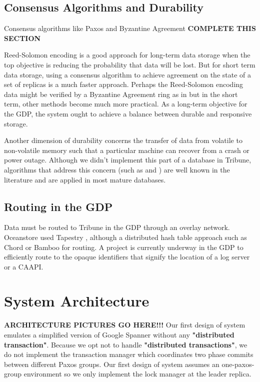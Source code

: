 \documentclass[10pt,twocolumn]{article}
\begin{document}
\subsection{Consensus Algorithms and Durability}

Consensus algorithms like Paxos \cite{Lamport_paxos} and Byzantine Agreement \cite{lamport_byzantine_1982}  \textbf{COMPLETE THIS SECTION}

Reed-Solomon encoding \cite{Reed-Solomon}  is a good approach for long-term data storage when the top objective is reducing the probability that data will be lost. But for short term data storage, using a consensus algorithm to achieve agreement on the state of a set of replicas is a much faster approach. Perhaps the Reed-Solomon encoding data might be verified by a Byzantine Agreement ring as in \cite{rhea_pond:_2003} but in the short term, other methods become much more practical. As a long-term objective for the GDP, the system ought to achieve a balance between durable and responsive storage.

Another dimension of durability concerns the transfer of data from volatile to non-volatile memory such that a particular machine can recover from a crash or power outage. Although we didn't implement this part of a database in Tribune, algorithms that address this concern (such as \cite{mohan_aries:_1992} and \cite{sears_segment-based_2009} ) are well known in the literature and are applied in most mature databases.

\subsection{Routing in the GDP}
Data must be routed to Tribune in the GDP through an overlay network. Oceanstore used Tapestry \cite{zhao_tapestry_2004}, although a distributed hash table approach such as Chord \cite{stoica_chord:_2003} or Bamboo \cite{rhea_handling_2003} for routing. A project is currently underway in the GDP to efficiently route to the opaque identifiers that signify the location of a log server or a CAAPI.


\section{System Architecture}
 \textbf{ARCHITECTURE PICTURES GO HERE!!!}
Our first design of system emulates a simplified version of Google Spanner without any \textbf{ "distributed transaction"}. Because we opt not to handle \textbf{"distributed transactions"}, we do not implement the transaction manager which coordinates two phase commits between different Paxos groups. Our first design of system assumes an one-paxos-group environment so we only implement the lock manager at the leader replica.
\end{document}

